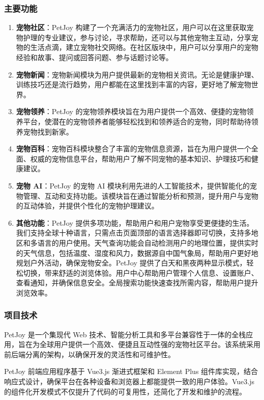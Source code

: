 \subsubsection{主要功能}
\begin{enumerate}
	\item \textbf{宠物社区}：PetJoy 构建了一个充满活力的宠物社区，用户可以在这里获取宠物护理的专业建议，参与讨论，寻求帮助，还可以与其他宠物主互动，分享宠物的生活点滴，建立宠物社交网络。在社区版块中，用户可以分享用户的宠物经验和故事、提问或回答问题、参与话题讨论等。
	\item \textbf{宠物新闻}：宠物新闻模块为用户提供最新的宠物相关资讯。无论是健康护理、训练技巧还是流行趋势，用户都能在这里找到丰富的内容，更好地了解宠物世界。
	\item \textbf{宠物领养}：PetJoy 的宠物领养模块旨在为用户提供一个高效、便捷的宠物领养平台，使潜在的宠物领养者能够轻松找到和领养适合的宠物，同时帮助待领养宠物找到新家。
	\item \textbf{宠物百科}：宠物百科模块整合了丰富的宠物信息资源，旨在为用户提供一个全面、权威的宠物信息平台，帮助用户了解不同宠物的基本知识、护理技巧和健康建议。
	\item \textbf{宠物 AI}：PetJoy 的宠物 AI 模块利用先进的人工智能技术，提供智能化的宠物管理、互动和支持功能。该模块旨在通过智能分析和预测，提升用户与宠物的互动体验，并提供个性化的宠物护理建议。
	\item \textbf{其他功能}：PetJoy 提供多项功能，帮助用户和用户宠物享受更便捷的生活。我们支持全球十种语言，只需点击页面顶部的语言选择器即可切换，支持多地区和多语言的用户使用。天气查询功能会自动检测用户的地理位置，提供实时的天气信息，包括温度、湿度和风力，数据源自中国气象局，帮助用户更好地规划户外活动，确保宠物安全。PetJoy 提供了白天和黑夜两种显示模式，轻松切换，带来舒适的浏览体验。用户中心帮助用户管理个人信息、设置账户、查看通知，并确保信息安全。全局搜索功能快速查找所需内容，帮助用户提升浏览效率。
\end{enumerate}

\subsubsection{项目技术}
PetJoy 是一个集现代 Web 技术、智能分析工具和多平台兼容性于一体的全栈应用，旨在为全球用户提供一个高效、便捷且互动性强的宠物社区平台。该系统采用前后端分离的架构，以确保开发的灵活性和可维护性。

PetJoy 前端应用程序基于 Vue3.js 渐进式框架和 Element Plus 组件库实现，结合响应式设计，确保平台在各种设备和浏览器上都能提供一致的用户体验。Vue3.js 的组件化开发模式不仅提升了代码的可复用性，还简化了开发和维护的流程。

